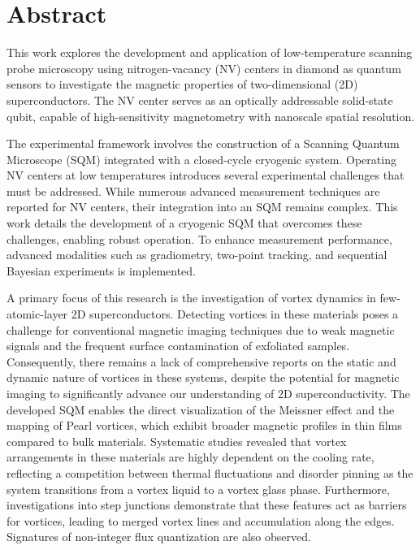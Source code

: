 \chapter*{Abstract}

This work explores the development and application of low-temperature scanning probe microscopy using nitrogen-vacancy (NV) centers in diamond as quantum sensors to investigate the magnetic properties of two-dimensional (2D) superconductors. The NV center serves as an optically addressable solid-state qubit, capable of high-sensitivity magnetometry with nanoscale spatial resolution. 

The experimental framework involves the construction of a Scanning Quantum Microscope (SQM) integrated with a closed-cycle cryogenic system. Operating NV centers at low temperatures introduces several experimental challenges that must be addressed. While numerous advanced measurement techniques are reported for NV centers, their integration into an SQM remains complex. This work details the development of a cryogenic SQM that overcomes these challenges, enabling robust operation. To enhance measurement performance, advanced modalities such as gradiometry, two-point tracking, and sequential Bayesian experiments is implemented.

A primary focus of this research is the investigation of vortex dynamics in few-atomic-layer 2D superconductors. Detecting vortices in these materials poses a challenge for conventional magnetic imaging techniques due to weak magnetic signals and the frequent surface contamination of exfoliated samples. Consequently, there remains a lack of comprehensive reports on the static and dynamic nature of vortices in these systems, despite the potential for magnetic imaging to significantly advance our understanding of 2D superconductivity. The developed SQM enables the direct visualization of the Meissner effect and the mapping of Pearl vortices, which exhibit broader magnetic profiles in thin films compared to bulk materials. Systematic studies revealed that vortex arrangements in these materials are highly dependent on the cooling rate, reflecting a competition between thermal fluctuations and disorder pinning as the system transitions from a vortex liquid to a vortex glass phase. Furthermore, investigations into step junctions demonstrate that these features act as barriers for vortices, leading to merged vortex lines and accumulation along the edges. Signatures of non-integer flux quantization are also observed.

